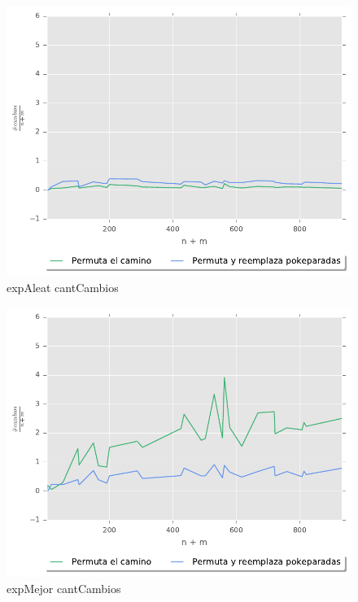 \begin{figure}[H]
  \begin{center}
    \includegraphics{../experimentacion/ej3/expAleat_cantCambios.pdf}
    \caption{expAleat cantCambios}
    \label{fig:expAleat_cantCambios}
  \end{center}
\end{figure}

\begin{figure}[H]
  \begin{center}
    \includegraphics{../experimentacion/ej3/expMejor_cantCambios.pdf}
    \caption{expMejor cantCambios}
    \label{fig:expMejor_cantCambios}
  \end{center}
\end{figure}

